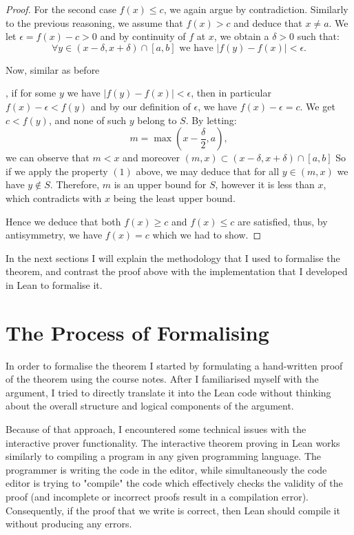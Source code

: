 \documentclass[11pt]{article}
\newcommand\weh{\text{ we have }}
\begin{document}
\begin{proof}
For the second case $f(x) \le c$, we again argue by contradiction. Similarly to
the previous reasoning, we assume that $f(x) > c$ and deduce that  $x \ne a$.
We let  $\epsilon = f(x) - c > 0$ and by continuity of $f$ at $x$, we obtain a
$\delta > 0$ such that:
\begin{equation}
  \forall y \in (x - \delta, x + \delta) \cap [a, b] \weh |f(y) - f(x)| < \epsilon
.\end{equation}

\hypertarget{upper_bound}{Now, similar as before}, if for some $y$ we have  $|f(y) - f(x)| < \epsilon$, then
in particular $f(x) - \epsilon < f(y) $ and by our definition of  $\epsilon$,
we have $f(x) - \epsilon = c $. We get  $c < f(y)$, and none of such
$y$ belong to $S$. By letting:
\[
m = \max \left(x - \frac{\delta}{2}, a\right)
,\]
we can observe that $m < x$ and moreover $(m, x) \subset (x - \delta, x + \delta) \cap [a, b]$
So if we apply the property $(1)$ above, we may deduce that for all $y \in (m, x)$
we have  $y \not\in S$. Therefore, $m$ is an upper bound for $S$, however it is
less than $x$, which contradicts with  $x$ being the least upper bound.

Hence we deduce that both $f(x) \ge c$ and  $f(x) \le c$ are satisfied, thus,
by antisymmetry, we have $f(x) = c$ which we had to show.
\end{proof}

In the next sections I will explain the methodology that I used to
formalise the theorem, and contrast the proof above with the implementation
that I developed in Lean to formalise it.
\section*{ The Process of Formalising }
In order to formalise the theorem I started by formulating a hand-written proof
of the theorem using the course notes. After I familiarised myself with the
argument, I tried to directly translate it into the Lean code without thinking
about the overall structure and logical components of the argument.

Because of that approach, I encountered some technical issues with the
interactive prover functionality. The interactive theorem proving in Lean works
similarly to compiling a program in any given programming language. The
programmer is writing the code in the editor, while simultaneously the code
editor is trying to "compile" the code which effectively
checks the validity of the proof (and incomplete or incorrect proofs result in
a compilation error). Consequently, if the proof that we write is correct, then
Lean should compile it without producing any errors.
\end{document}

